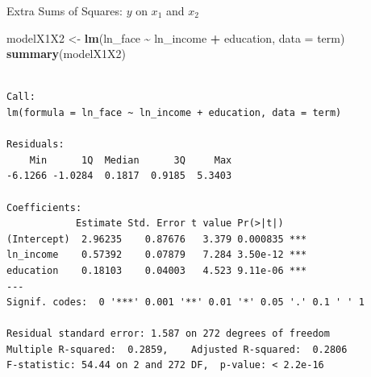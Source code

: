 \documentclass[
  ignorenonframetext,
]{beamer}
\newenvironment{Shaded}{\begin{snugshade}}{\end{snugshade}}
\newcommand{\AttributeTok}[1]{\textcolor[rgb]{0.13,0.29,0.53}{#1}}
\newcommand{\FunctionTok}[1]{\textcolor[rgb]{0.13,0.29,0.53}{\textbf{#1}}}
\newcommand{\NormalTok}[1]{#1}
\newcommand{\OtherTok}[1]{\textcolor[rgb]{0.56,0.35,0.01}{#1}}
\newcommand{\SpecialCharTok}[1]{\textcolor[rgb]{0.81,0.36,0.00}{\textbf{#1}}}
\begin{document}
\begin{frame}[fragile]{Extra Sums of Squares: \(y\) on \(x_1\) and
\(x_2\)}
\label{extra-sums-of-squares-y-on-x_1-and-x_2}
\footnotesize

\begin{Shaded}
\begin{Highlighting}[]
\NormalTok{modelX1X2 }\OtherTok{\textless{}{-}} \FunctionTok{lm}\NormalTok{(ln\_face }\SpecialCharTok{\textasciitilde{}}\NormalTok{ ln\_income }\SpecialCharTok{+}\NormalTok{ education, }\AttributeTok{data =}\NormalTok{ term)}
\FunctionTok{summary}\NormalTok{(modelX1X2)}
\end{Highlighting}
\end{Shaded}

\begin{verbatim}

Call:
lm(formula = ln_face ~ ln_income + education, data = term)

Residuals:
    Min      1Q  Median      3Q     Max 
-6.1266 -1.0284  0.1817  0.9185  5.3403 

Coefficients:
            Estimate Std. Error t value Pr(>|t|)    
(Intercept)  2.96235    0.87676   3.379 0.000835 ***
ln_income    0.57392    0.07879   7.284 3.50e-12 ***
education    0.18103    0.04003   4.523 9.11e-06 ***
---
Signif. codes:  0 '***' 0.001 '**' 0.01 '*' 0.05 '.' 0.1 ' ' 1

Residual standard error: 1.587 on 272 degrees of freedom
Multiple R-squared:  0.2859,    Adjusted R-squared:  0.2806 
F-statistic: 54.44 on 2 and 272 DF,  p-value: < 2.2e-16
\end{verbatim}

\normalsize
\end{frame}
\end{document}
